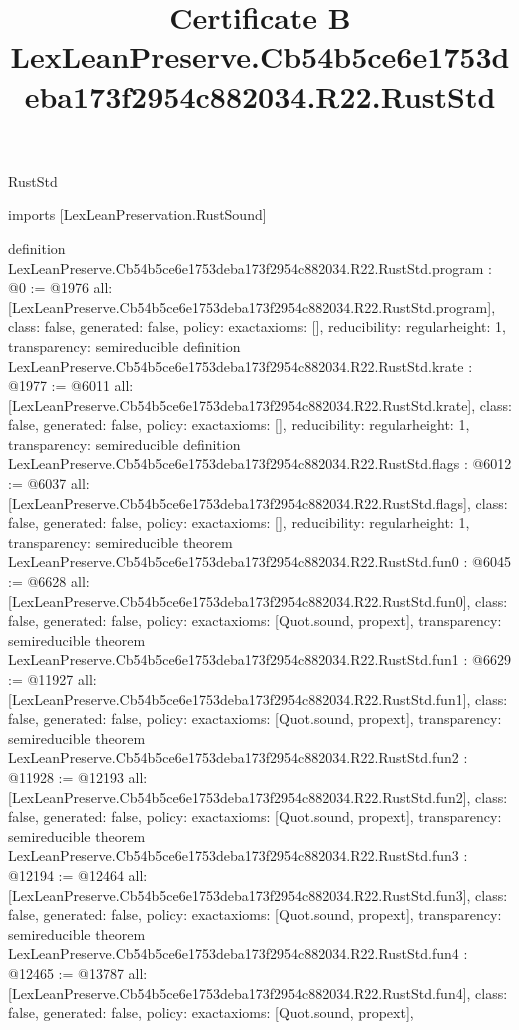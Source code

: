 \begin{lexlean}{RustStd}
\title{Certificate B LexLeanPreserve.Cb54b5ce6e1753deba173f2954c882034.R22.RustStd}
\begin{coremodule}
imports [LexLeanPreservation.RustSound]

definition LexLeanPreserve.Cb54b5ce6e1753deba173f2954c882034.R22.RustStd.program : @0 := @1976 {
  all: [LexLeanPreserve.Cb54b5ce6e1753deba173f2954c882034.R22.RustStd.program],
  class: false,
  generated: false,
  policy: exact{axioms: []},
  reducibility: regular{height: 1},
  transparency: semireducible
}
definition LexLeanPreserve.Cb54b5ce6e1753deba173f2954c882034.R22.RustStd.krate : @1977 := @6011 {
  all: [LexLeanPreserve.Cb54b5ce6e1753deba173f2954c882034.R22.RustStd.krate],
  class: false,
  generated: false,
  policy: exact{axioms: []},
  reducibility: regular{height: 1},
  transparency: semireducible
}
definition LexLeanPreserve.Cb54b5ce6e1753deba173f2954c882034.R22.RustStd.flags : @6012 := @6037 {
  all: [LexLeanPreserve.Cb54b5ce6e1753deba173f2954c882034.R22.RustStd.flags],
  class: false,
  generated: false,
  policy: exact{axioms: []},
  reducibility: regular{height: 1},
  transparency: semireducible
}
theorem LexLeanPreserve.Cb54b5ce6e1753deba173f2954c882034.R22.RustStd.fun0 : @6045 := @6628 {
  all: [LexLeanPreserve.Cb54b5ce6e1753deba173f2954c882034.R22.RustStd.fun0],
  class: false,
  generated: false,
  policy: exact{axioms: [Quot.sound, propext]},
  transparency: semireducible
}
theorem LexLeanPreserve.Cb54b5ce6e1753deba173f2954c882034.R22.RustStd.fun1 : @6629 := @11927 {
  all: [LexLeanPreserve.Cb54b5ce6e1753deba173f2954c882034.R22.RustStd.fun1],
  class: false,
  generated: false,
  policy: exact{axioms: [Quot.sound, propext]},
  transparency: semireducible
}
theorem LexLeanPreserve.Cb54b5ce6e1753deba173f2954c882034.R22.RustStd.fun2 : @11928 := @12193 {
  all: [LexLeanPreserve.Cb54b5ce6e1753deba173f2954c882034.R22.RustStd.fun2],
  class: false,
  generated: false,
  policy: exact{axioms: [Quot.sound, propext]},
  transparency: semireducible
}
theorem LexLeanPreserve.Cb54b5ce6e1753deba173f2954c882034.R22.RustStd.fun3 : @12194 := @12464 {
  all: [LexLeanPreserve.Cb54b5ce6e1753deba173f2954c882034.R22.RustStd.fun3],
  class: false,
  generated: false,
  policy: exact{axioms: [Quot.sound, propext]},
  transparency: semireducible
}
theorem LexLeanPreserve.Cb54b5ce6e1753deba173f2954c882034.R22.RustStd.fun4 : @12465 := @13787 {
  all: [LexLeanPreserve.Cb54b5ce6e1753deba173f2954c882034.R22.RustStd.fun4],
  class: false,
  generated: false,
  policy: exact{axioms: [Quot.sound, propext]},
}
\end{coremodule}
\end{lexlean}

